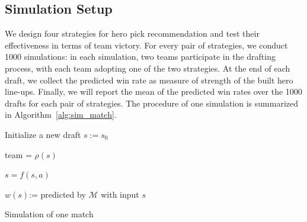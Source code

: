 \subsection{Simulation Setup}
We design four strategies for hero pick recommendation and test their effectiveness in terms of team victory. For every pair of strategies, we conduct 1000 simulations: in each simulation, two teams participate in the drafting process, with each team adopting one of the two strategies. At the end of each draft, we collect the predicted win rate as measure of strength of the built hero line-ups. Finally, we will report the mean of the predicted win rates over the 1000 drafts for each pair of strategies. The procedure of one simulation is summarized in Algorithm~\ref{alg:sim_match}.

\begin{algorithm}
    \BlankLine
    Initialize a new draft $s:= s_{0}$ 
    \BlankLine
     {
    team = $\rho(s)$
    
    
    
    $s = f(s,a)$
    }
    
    $w(s)$:= predicted by $\mathcal{M}$ with input $s$
    \caption{Simulation of one match}
    \label{alg:sim_match}
\end{algorithm}

